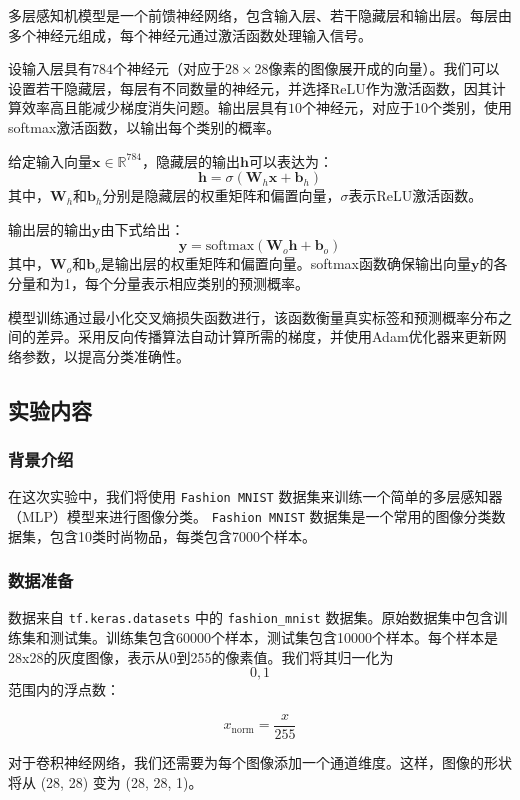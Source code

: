 \documentclass[a4paper,12pt]{article}
\begin{document}
多层感知机模型是一个前馈神经网络，包含输入层、若干隐藏层和输出层。每层由多个神经元组成，每个神经元通过激活函数处理输入信号。


设输入层具有$784$个神经元（对应于$28 \times 28$像素的图像展开成的向量）。我们可以设置若干隐藏层，每层有不同数量的神经元，并选择ReLU作为激活函数，因其计算效率高且能减少梯度消失问题。输出层具有$10$个神经元，对应于10个类别，使用softmax激活函数，以输出每个类别的概率。

给定输入向量$\mathbf{x} \in \mathbb{R}^{784}$，隐藏层的输出$\mathbf{h}$可以表达为：
\[
\mathbf{h} = \sigma(\mathbf{W}_h \mathbf{x} + \mathbf{b}_h)
\]
其中，$\mathbf{W}_h$和$\mathbf{b}_h$分别是隐藏层的权重矩阵和偏置向量，$\sigma$表示ReLU激活函数。

输出层的输出$\mathbf{y}$由下式给出：
\[
\mathbf{y} = \text{softmax}(\mathbf{W}_o \mathbf{h} + \mathbf{b}_o)
\]
其中，$\mathbf{W}_o$和$\mathbf{b}_o$是输出层的权重矩阵和偏置向量。softmax函数确保输出向量$\mathbf{y}$的各分量和为1，每个分量表示相应类别的预测概率。


模型训练通过最小化交叉熵损失函数进行，该函数衡量真实标签和预测概率分布之间的差异。采用反向传播算法自动计算所需的梯度，并使用Adam优化器来更新网络参数，以提高分类准确性。


\subsection{实验内容}
\subsubsection{背景介绍}

在这次实验中，我们将使用 \texttt{Fashion MNIST} 数据集来训练一个简单的多层感知器（MLP）模型来进行图像分类。 \texttt{Fashion MNIST} 数据集是一个常用的图像分类数据集，包含10类时尚物品，每类包含7000个样本。

\subsubsection{数据准备}

数据来自 \texttt{tf.keras.datasets} 中的 \texttt{fashion\_mnist} 数据集。原始数据集中包含训练集和测试集。训练集包含60000个样本，测试集包含10000个样本。每个样本是28x28的灰度图像，表示从0到255的像素值。我们将其归一化为\[0, 1\]范围内的浮点数：

\[
x_{\text{norm}} = \frac{x}{255}
\]

对于卷积神经网络，我们还需要为每个图像添加一个通道维度。这样，图像的形状将从 (28, 28) 变为 (28, 28, 1)。
\end{document}
